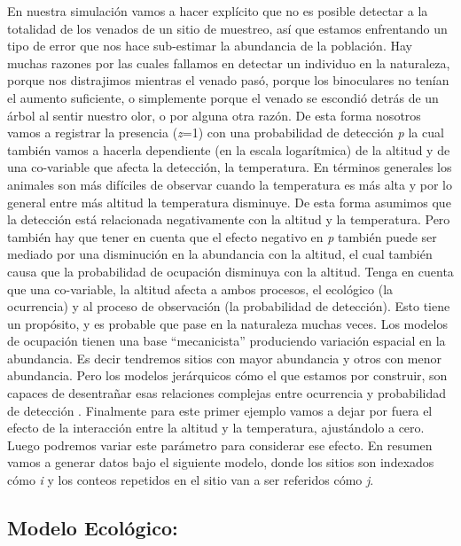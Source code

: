 \documentclass[
]{book}
\begin{document}
En nuestra simulación vamos a hacer explícito que no es posible detectar a la totalidad de los venados de un sitio de muestreo, así que estamos enfrentando un tipo de error que nos hace sub-estimar la abundancia de la población. Hay muchas razones por las cuales fallamos en detectar un individuo en la naturaleza, porque nos distrajimos mientras el venado pasó, porque los binoculares no tenían el aumento suficiente, o simplemente porque el venado se escondió detrás de un árbol al sentir nuestro olor, o por alguna otra razón. De esta forma nosotros vamos a registrar la presencia (\emph{z}=1) con una probabilidad de detección \emph{p} la cual también vamos a hacerla dependiente (en la escala logarítmica) de la altitud y de una co-variable que afecta la detección, la temperatura. En términos generales los animales son más difíciles de observar cuando la temperatura es más alta y por lo general entre más altitud la temperatura disminuye. De esta forma asumimos que la detección está relacionada negativamente con la altitud y la temperatura. Pero también hay que tener en cuenta que el efecto negativo en \emph{p} también puede ser mediado por una disminución en la abundancia con la altitud, el cual también causa que la probabilidad de ocupación disminuya con la altitud. Tenga en cuenta que una co-variable, la altitud afecta a ambos procesos, el ecológico (la ocurrencia) y al proceso de observación (la probabilidad de detección). Esto tiene un propósito, y es probable que pase en la naturaleza muchas veces. Los modelos de ocupación tienen una base ``mecanicista'' produciendo variación espacial en la abundancia. Es decir tendremos sitios con mayor abundancia y otros con menor abundancia. Pero los modelos jerárquicos cómo el que estamos por construir, son capaces de desentrañar esas relaciones complejas entre ocurrencia y probabilidad de detección \citep{Kery2008, KERY2008, Kery2012}. Finalmente para este primer ejemplo vamos a dejar por fuera el efecto de la interacción entre la altitud y la temperatura, ajustándolo a cero. Luego podremos variar este parámetro para considerar ese efecto. En resumen vamos a generar datos bajo el siguiente modelo, donde los sitios son indexados cómo \emph{i} y los conteos repetidos en el sitio van a ser referidos cómo \emph{j}.

\hypertarget{modelo-ecoluxf3gico}{%
\subsection{Modelo Ecológico:}\label{modelo-ecoluxf3gico}}
\end{document}
